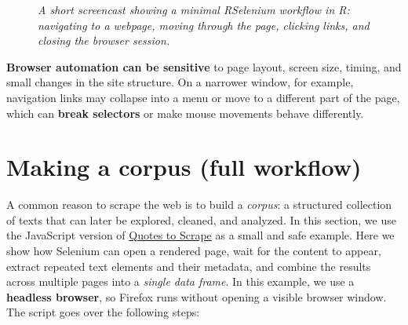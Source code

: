 \documentclass[
  letterpaper,
  DIV=11,
  numbers=noendperiod]{scrreprt}
\begin{document}
\begin{figure}


\caption{\label{fig-rselenium-demo}\emph{A short screencast showing a
minimal RSelenium workflow in R: navigating to a webpage, moving through
the page, clicking links, and closing the browser session.}}

\end{figure}%

\begin{tcolorbox}[enhanced jigsaw, breakable, title=\textcolor{quarto-callout-warning-color}{\faExclamationTriangle}\hspace{0.5em}{A small warning}, arc=.35mm, toprule=.15mm, rightrule=.15mm, leftrule=.75mm, bottomtitle=1mm, coltitle=black, toptitle=1mm, colbacktitle=quarto-callout-warning-color!10!white, colframe=quarto-callout-warning-color-frame, titlerule=0mm, bottomrule=.15mm, opacitybacktitle=0.6, left=2mm, colback=white, opacityback=0]

\textbf{Browser automation can be sensitive} to page layout, screen
size, timing, and small changes in the site structure. On a narrower
window, for example, navigation links may collapse into a menu or move
to a different part of the page, which can \textbf{break selectors} or
make mouse movements behave differently.

\end{tcolorbox}

\section{Making a corpus (full
workflow)}\label{making-a-corpus-full-workflow}

A common reason to scrape the web is to build a \emph{corpus}: a
structured collection of texts that can later be explored, cleaned, and
analyzed. In this section, we use the JavaScript version of
\href{https://quotes.toscrape.com/js/}{Quotes to Scrape} as a small and
safe example. Here we show how Selenium can open a rendered page, wait
for the content to appear, extract repeated text elements and their
metadata, and combine the results across multiple pages into a
\emph{single data frame}. In this example, we use a \textbf{headless
browser}, so Firefox runs without opening a visible browser window. The
script goes over the following steps:
\end{document}

